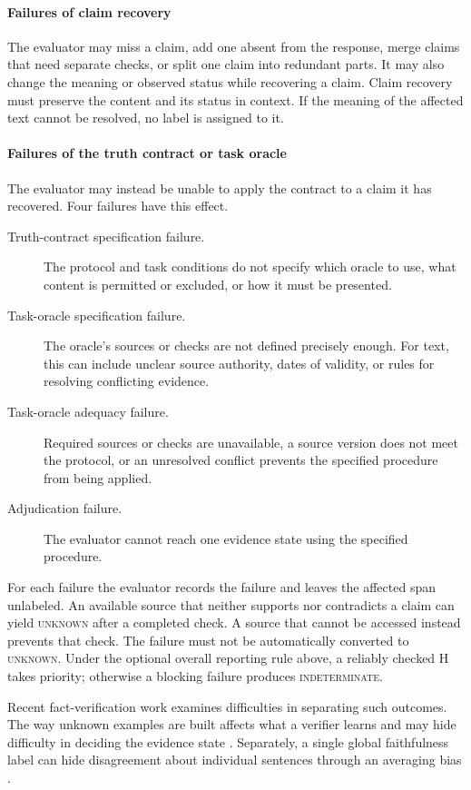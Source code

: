 \documentclass{clv2025}
\begin{document}
\paragraph{Failures of claim recovery}
The evaluator may miss a claim, add one absent from the response, merge claims
that need separate checks, or split one claim into redundant parts. It may
also change the meaning or observed status while recovering a claim.
Claim recovery must preserve the content and its status in context. If the meaning of the affected text
cannot be resolved, no label is assigned to it.

\paragraph{Failures of the truth contract or task oracle}
The evaluator may instead be unable to apply the contract to a claim it has
recovered. Four failures have this effect.
\begin{description}
  \item[Truth-contract specification failure.] The protocol and task conditions
        do not specify which oracle to use, what content is permitted or
        excluded, or how it must be presented.
  \item[Task-oracle specification failure.] The oracle's sources or checks are
        not defined precisely enough. For text, this can include unclear source
        authority, dates of validity, or rules for resolving conflicting evidence.
  \item[Task-oracle adequacy failure.] Required sources or checks are unavailable,
        a source version does not meet the protocol, or an unresolved conflict
        prevents the specified procedure from being applied.
  \item[Adjudication failure.] The evaluator cannot reach one evidence state
        using the specified procedure.
\end{description}
For each failure the evaluator records the failure and leaves the affected span
unlabeled.
An available source that neither supports nor contradicts a claim can yield
\textsc{unknown} after a completed check. A source that cannot be accessed
instead prevents that check. The failure must not be automatically converted
to \textsc{unknown}. Under the optional overall reporting rule above, a
reliably checked H takes priority; otherwise a blocking failure produces
\textsc{indeterminate}.

Recent fact-verification work examines difficulties in separating such
outcomes. The way unknown examples are built affects what a verifier learns
and may hide difficulty in deciding the evidence state
\citep{qiu_evidence_2026}. Separately, a single global faithfulness label can
hide disagreement about individual sentences through an averaging bias
\citep{zhang_averaging_2026}.
\end{document}
